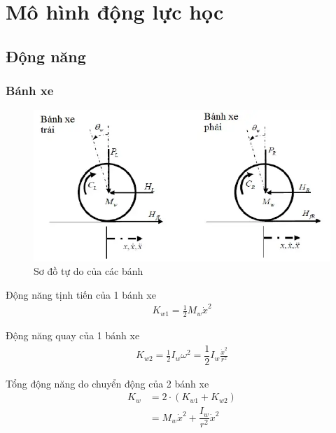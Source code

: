     \section{Mô hình động lực học}
    \subsection*{Động năng}
    \subsubsection*{Bánh xe}
        \begin{figure}[H]
            \centering
            \includegraphics[width=1\textwidth]{pictures/wheel.png} 
            \caption{Sơ đồ tự do của các bánh}
        \end{figure}
        
        Động năng tịnh tiến của 1 bánh xe
        \begin{align}
            K_{w1} = \frac{1}{2} M_w \dot{x}^2
        \end{align}
        
        Động năng quay của 1 bánh xe
        \begin{align}
            K_{w2} = \frac{1}{2} I_w \omega^2 = \dfrac{1}{2} I_w \frac{\dot{x}^2}{r^2}
        \end{align}

        Tổng động năng do chuyển động của 2 bánh xe
        \begin{align}
            K_w &= 2 \cdot \left(K_{w1} + K_{w2}\right) \nonumber\\
                &= M_w \dot{x}^2 + \dfrac{I_w}{r^2} \dot{x}^2
        \end{align}
        

        
        

